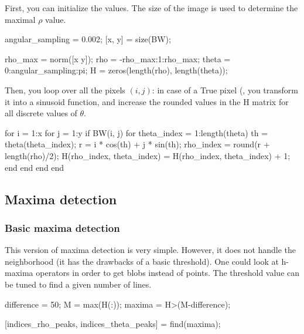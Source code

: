 First, you can initialize the values. The size of the image is used to determine the maximal $\rho$ value.

\begin{matlab}
angular_sampling = 0.002; %
[x, y] = size(BW);

rho_max = norm([x y]);                                                
rho = -rho_max:1:rho_max;
theta = 0:angular_sampling:pi;
H = zeros(length(rho), length(theta));
\end{matlab}

Then, you loop over all the pixels $(i,j)$: in case of a True pixel (, you transform it into a sinusoid function, and increase the rounded values in the H matrix for all discrete values of $\theta$.

\begin{matlab}
for i = 1:x
    for j = 1:y
        if BW(i, j)
            for theta_index = 1:length(theta)
                th = theta(theta_index);
                r  = i * cos(th) + j * sin(th);
                rho_index = round(r + length(rho)/2);                      
                H(rho_index, theta_index) = H(rho_index, theta_index) + 1;
            end
        end
    end
end
\end{matlab}


\subsection{Maxima detection}
\subsubsection{Basic maxima detection}
This version of maxima detection is very simple. However, it does not handle the neighborhood (it has the drawbacks of a basic threshold). One could look at h-maxima operators in order to get blobs instead of points. The threshold value can be tuned to find a given number of lines.

\begin{matlab}
difference = 50;
M = max(H(:));
maxima = H>(M-difference);

[indices_rho_peaks, indices_theta_peaks] = find(maxima);
\end{matlab}

